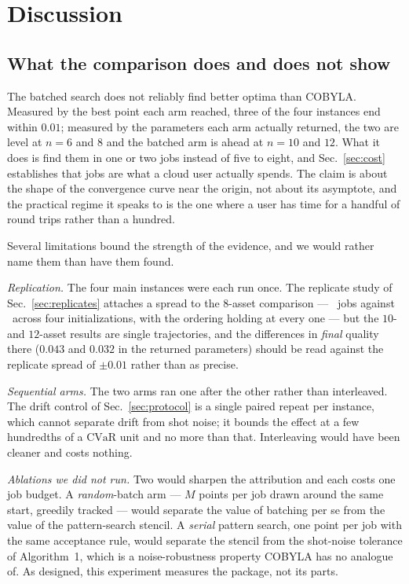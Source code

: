 \documentclass[aps,prx,preprint,superscriptaddress,nofootinbib,longbibliography]{revtex4-2}
\newcommand{\CVaR}{\mathrm{CVaR}}
\begin{document}
\section{Discussion}
\label{sec:discussion}

\subsection{What the comparison does and does not show}

The batched search does not reliably find better optima than COBYLA. Measured by the best point
each arm reached, three of the four instances end within $0.01$; measured by the parameters each
arm actually returned, the two are level at $n=6$ and $8$ and the batched arm is ahead at $n=10$
and $12$. What it does is
find them in one or two jobs instead of five to eight, and Sec.~\ref{sec:cost} establishes
that jobs are what a cloud user actually spends. The claim is about the shape of the
convergence curve near the origin, not about its asymptote, and the practical regime it
speaks to is the one where a user has time for a handful of round trips rather than a hundred.

Several limitations bound the strength of the evidence, and we would rather name them than
have them found.

\emph{Replication.} The four main instances were each run once. The replicate study of
Sec.~\ref{sec:replicates} attaches a spread to the $8$-asset comparison --- \repnbmean\ jobs
against \repnsmean\ across four initializations, with the ordering holding at every one --- but
the $10$- and $12$-asset results are single trajectories, and the differences in \emph{final}
quality there ($0.043$ and $0.032$ in the returned parameters) should be read against the
replicate spread of $\pm 0.01$ rather than as precise.

\emph{Sequential arms.} The two arms ran one after the other rather than interleaved. The drift
control of Sec.~\ref{sec:protocol} is a single paired repeat per instance, which cannot separate
drift from shot noise; it bounds the effect at a few hundredths of a $\CVaR$ unit and no more
than that. Interleaving would have been cleaner and costs nothing.

\emph{Ablations we did not run.} Two would sharpen the attribution and each costs one job budget.
A \emph{random}-batch arm --- $M$ points per job drawn around the same start, greedily tracked
--- would separate the value of batching per se from the value of the pattern-search stencil. A
\emph{serial} pattern search, one point per job with the same acceptance rule, would separate the
stencil from the shot-noise tolerance of Algorithm~1, which is a noise-robustness property COBYLA
has no analogue of. As designed, this experiment measures the package, not its parts.
\end{document}
